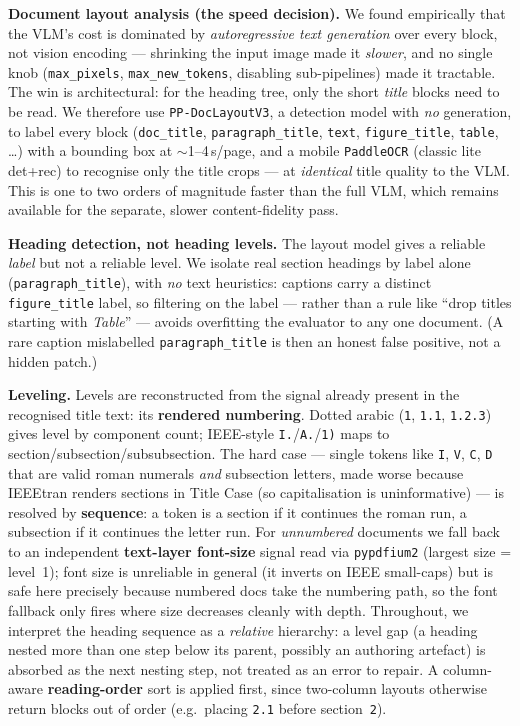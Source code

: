 \documentclass[11pt, a4paper]{article}
\begin{document}
\textbf{Document layout analysis (the speed decision).} We found
empirically that the VLM's cost is dominated by \emph{autoregressive text
generation} over every block, not vision encoding --- shrinking the input
image made it \emph{slower}, and no single knob (\texttt{max\_pixels},
\texttt{max\_new\_tokens}, disabling sub-pipelines) made it tractable.
The win is architectural: for the heading tree, only the short
\emph{title} blocks need to be read. We therefore use
\texttt{PP-DocLayoutV3}, a detection model with \emph{no} generation, to
label every block (\texttt{doc\_title}, \texttt{paragraph\_title},
\texttt{text}, \texttt{figure\_title}, \texttt{table}, \ldots) with a
bounding box at $\sim$1--4\,s/page, and a mobile \texttt{PaddleOCR}
(classic lite det+rec) to recognise only the title crops --- at
\emph{identical} title quality to the VLM. This is one to two orders of
magnitude faster than the full VLM, which remains available for the
separate, slower content-fidelity pass.

\textbf{Heading detection, not heading levels.} The layout model gives a
reliable \emph{label} but not a reliable level. We isolate real section
headings by label alone (\texttt{paragraph\_title}), with \emph{no} text
heuristics: captions carry a distinct \texttt{figure\_title} label, so
filtering on the label --- rather than a rule like ``drop titles starting
with \emph{Table}'' --- avoids overfitting the evaluator to any one
document. (A rare caption mislabelled \texttt{paragraph\_title} is then
an honest false positive, not a hidden patch.)

\textbf{Leveling.} Levels are reconstructed from the signal already
present in the recognised title text: its \textbf{rendered numbering}.
Dotted arabic (\texttt{1}, \texttt{1.1}, \texttt{1.2.3}) gives level by
component count; IEEE-style \texttt{I.}/\texttt{A.}/\texttt{1)} maps to
section/subsection/subsubsection. The hard case --- single tokens like
\texttt{I}, \texttt{V}, \texttt{C}, \texttt{D} that are valid roman
numerals \emph{and} subsection letters, made worse because IEEEtran
renders sections in Title Case (so capitalisation is uninformative) ---
is resolved by \textbf{sequence}: a token is a section if it continues
the roman run, a subsection if it continues the letter run. For
\emph{unnumbered} documents we fall back to an independent
\textbf{text-layer font-size} signal read via \texttt{pypdfium2} (largest
size = level~1); font size is unreliable in general (it inverts on IEEE
small-caps) but is safe here precisely because numbered docs take the
numbering path, so the font fallback only fires where size decreases
cleanly with depth. Throughout, we interpret the heading sequence as a
\emph{relative} hierarchy: a level gap (a heading nested more than one
step below its parent, possibly an authoring artefact) is absorbed as the
next nesting step, not treated as an error to repair. A column-aware
\textbf{reading-order} sort is applied first, since two-column layouts
otherwise return blocks out of order (e.g.\ placing \texttt{2.1} before
section~\texttt{2}).
\end{document}
